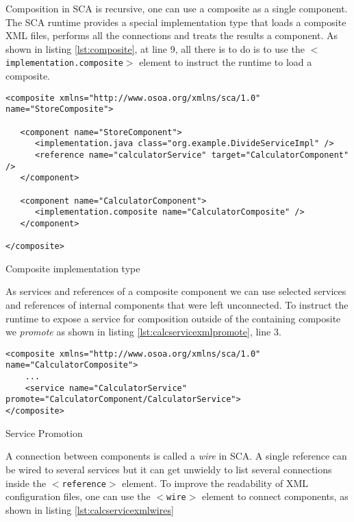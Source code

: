 Composition in SCA is recursive, one can use a composite as a single component. The SCA runtime provides a special implementation
type that loads a composite XML files, performs all the connections and treats the results a component. As shown in listing
\ref{lst:composite}, at line 9, all there is to do is to use the \texttt{$<$implementation.composite$>$} element to instruct the runtime
to load a composite.

\begin{listing}
\begin{verbatim}
<composite xmlns="http://www.osoa.org/xmlns/sca/1.0" name="StoreComposite">

   <component name="StoreComponent">
      <implementation.java class="org.example.DivideServiceImpl" />
      <reference name="calculatorService" target="CalculatorComponent" />
   </component>

   <component name="CalculatorComponent">
      <implementation.composite name="CalculatorComposite" />
   </component>

</composite>
\end{verbatim}
\caption{Composite implementation type}
\label{lst:composite}
\end{listing}

As services and references of a composite component we can use selected services and references of internal components
that were left unconnected. To instruct the runtime to expose a service for composition outside of the containing composite
we \emph{promote} as shown in listing \ref{lst:calcservicexmlpromote}, line 3.

\begin{listing}
\begin{verbatim}
<composite xmlns="http://www.osoa.org/xmlns/sca/1.0" name="CalculatorComposite">
    ...
    <service name="CalculatorService" promote="CalculatorComponent/CalculatorService">
</composite>
\end{verbatim}
\caption{Service Promotion}
\label{lst:calcservicexmlpromote}
\end{listing}

A connection between components is called a \emph{wire} in SCA. A single reference can be wired to several services
but it can get unwieldy to list several connections inside the \texttt{$<$reference$>$} element. To improve the readability
of XML configuration files, one can use the \texttt{$<$wire$>$} element to connect components, as shown in listing 
\ref{lst:calcservicexmlwires}


